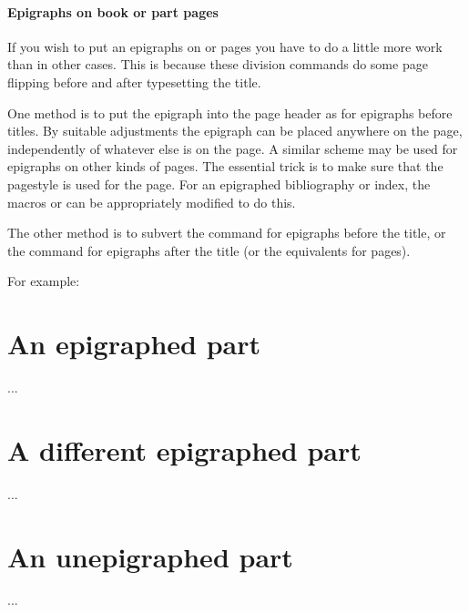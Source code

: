  \subsection{Epigraphs on book or part pages}


    If you wish to put an epigraphs on \cmd{\book} or \cmd{\part}
pages you have to do a little more work than in other cases. This
is because these division commands do some page flipping before and
after typesetting the title.

   One method is to put the epigraph into the page header as for epigraphs
before \cmd{\chapter} titles. By suitable adjustments the epigraph can be
placed anywhere on the page, independently of whatever else is on the page.
     A similar scheme may be used for epigraphs on other kinds of pages. 
 The essential
 trick is to make sure that the  pagestyle is used for
 the page.
    For an epigraphed bibliography 
or index, the macros \cmd{\prebibhook}
or \cmd{\preindexhook} can be appropriately modified to do this.

    The other method is to subvert the \cmd{\beforepartskip} command 
for epigraphs before the title, or the \cmd{\afterpartskip} command
for epigraphs after the title (or the equivalents for \cmd{\book} pages).

    For example:
\begin{lcode}
\let\oldbeforepartskip\beforepartskip %
\renewcommand*{\beforepartskip}{%
  \epigraph{...}{...}%
  \vfil}
\part{An epigraphed part}
...
\renewcommand*{\beforepartskip}{%
  \epigraph{...}{...}%
  \vfil}
\part{A different epigraphed part}
...
\let\beforepartskip\oldbeforepartskip %
\part{An unepigraphed part}
...
\end{lcode}



